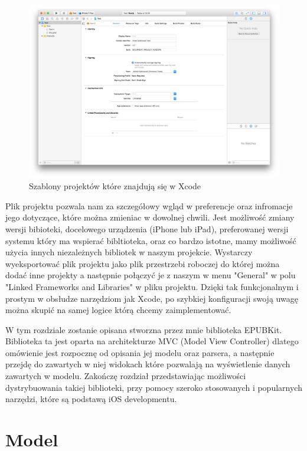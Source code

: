 \begin{figure}[ht!]
  \centering
  \includegraphics[width=120mm]{images/chapter-4-image-2-empty-project.png}
  \caption{Szablony projektów które znajdują się w Xcode}
  \label{chapter-4-image-2-empty-project}
\end{figure}

Plik projektu pozwala nam za szczegółowy wgląd w preferencje oraz infromacje jego dotyczące, które można zmieniac w dowolnej chwili. Jest możliwość zmiany wersji bibioteki, docelowego urządzenia (iPhone lub iPad), preferowanej wersji systemu który ma wspierać bibltioteka, oraz co bardzo istotne, mamy możliwość użycia innych niezależnych bibliotek w naszym projekcie. Wystarczy wyeksportować plik projektu jako plik przestrzebi roboczej do której można dodać inne projekty a następnie połączyć je z naszym w menu "General" w polu "Linked Frameworks and Libraries" w pliku projektu. Dzięki tak funkcjonalnym i prostym w obsłudze narzędziom jak Xcode, po szybkiej konfiguracji swoją uwagę można skupić na samej logice którą chcemy zaimplementować.

W tym rozdziale zostanie opisana stworzna przez mnie biblioteka EPUBKit. Biblioteka ta jest oparta na architekturze MVC (Model View Controller) dlatego omówienie jest rozpocznę od opisania jej modelu oraz parsera, a następnie przejdę do zawartych w niej widokach które pozwalają na wyświetlenie danych zawartych w modelu. Zakończę rozdział przedstawiając możliwości dystrybuowania takiej biblioteki, przy pomocy szeroko stosowanych i popularnych narzędzi, które są podstawą iOS developmentu.

\section{Model}

